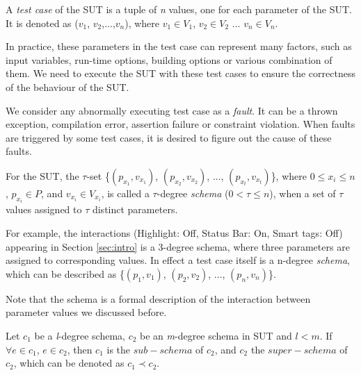 \documentclass{sig-alternate-05-2015}
\begin{document}
\newtheorem{assumption}{Assumption}
\newtheorem{proposition}{Proposition}

\begin{definition}\label{de:testcase}
A \emph{test case} of the SUT is a tuple of \emph{n} values, one for each parameter of the SUT. It is denoted as  ($v_{1}$, $v_{2}$,...,$v_{n}$), where $v_{1}\in V_{1}$, $v_{2} \in V_{2}$ ... $v_{n} \in V_{n}$.
\end{definition}

In practice, these parameters in the test case can represent many factors, such as input variables, run-time options, building options or various combination of them. We need to execute the SUT with these test cases to ensure the correctness of the behaviour of the SUT.

We consider any abnormally executing test case as a \emph{fault}. It can be a thrown exception, compilation error, assertion failure or constraint violation. When faults are triggered by some test cases, it is desired to figure out the cause of these faults.


\begin{definition}\label{de:schema}
For the SUT, the $\tau$-set \{$(p_{x_{1}}, v_{x_{1}})$, $(p_{x_{2}}, v_{x_{2}})$, ..., $(p_{x_{t}}, v_{x_{t}})$\}, where $0 \leq x_{i} \leq n$, $p_{x_{i}} \in P$, and $v_{x_{i}} \in V_{x_{i}}$, is called a $\tau$-degree \emph{schema} ($0 < \tau \leq n $), when a set of $\tau$ values assigned to $\tau$ distinct parameters.

For example, the interactions (Highlight: Off, Status Bar: On, Smart tags: Off) appearing in Section \ref{sec:intro} is a 3-degree schema, where three parameters are assigned to corresponding values. In effect a test case itself is a n-degree \emph{schema}, which can be described as \{$(p_{1}, v_{1})$, $(p_{2}, v_{2})$, ..., $(p_{n}, v_{n})$\}.
\end{definition}
Note that the schema is a formal description of the interaction between parameter values we discussed before.

\begin{definition}\label{de:subsume}
Let $c_{1}$ be a \emph{l}-degree schema, $c_{2}$ be an \emph{m}-degree schema in SUT and $l < m$. If $\forall e \in c_{1}$, $e \in c_{2}$, then $c_{1}$ is the $sub-schema$ of $c_{2}$, and $c_{2}$ the $super-schema$ of $c_{2}$, which can be denoted as $c_{1} \prec c_{2}$.
\end{definition}
\end{document}
